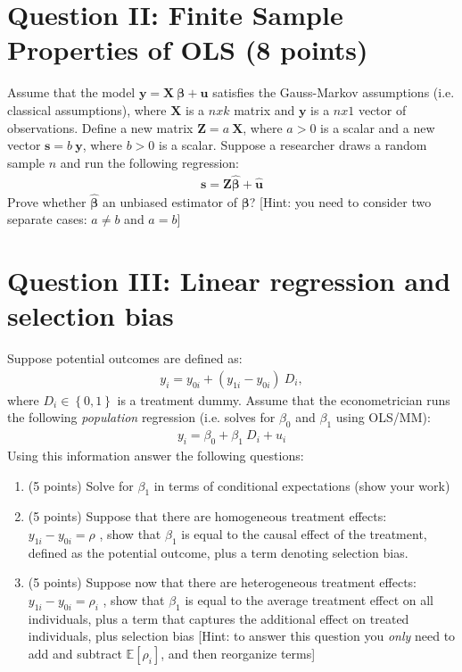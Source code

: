 \documentclass[letterpaper,12pt]{article}
\theoremstyle{dotlessS}
\begin{document}
\section*{Question II: Finite Sample Properties of OLS (8 points)}
Assume that the model $\bm{y}=\bm{X} \: \bm{\beta}+\bm{u}$ satisfies the Gauss-Markov assumptions (i.e. classical assumptions), where $\bm{X}$ is a $n x k$ matrix and $\bm{y}$ is a $n x 1$ vector of observations. Define a new matrix $\bm{Z}=a \: \bm{X}$, where $a>0$ is a scalar and a new vector $\bm{s}=b \: \bm{y}$, where $b>0$ is a scalar. Suppose a researcher draws a random sample $n$ and run the following regression:
\begin{eqnarray*}
\bm{s}=\bm{Z} \bm{\hat{\beta}}+\bm{\hat{u}}
\end{eqnarray*}
Prove whether $\bm{\hat{\beta}}$ an unbiased estimator of $\bm{\beta}$? [Hint: you need to consider two separate cases: $a \neq b$ and $a=b$] 



\section*{Question III: Linear regression and selection bias }
Suppose potential outcomes are defined as:
\begin{eqnarray*}
y_i=y_{0i}+(y_{1i}-y_{0i}) \: D_i,
\end{eqnarray*}
where $D_i \in \left\{0,1\right\}$ is a treatment dummy. Assume that the econometrician runs the following \textit{population} regression (i.e. solves for $\beta_0$ and $\beta_1$ using OLS/MM):
\begin{eqnarray*}
y_i=\beta_0+\beta_1 \: D_i+u_i
\end{eqnarray*}
Using this information answer the following questions:
\begin{enumerate}[label=(\alph*)]
\item (5 points) Solve for $\beta_1$ in terms of conditional expectations (show your work)
\item (5 points) Suppose that there are homogeneous treatment effects: $y_{1i}-y_{0i}=\rho$ , show that $\beta_1$ is equal to the causal effect of the treatment, defined as the potential outcome, plus a term denoting selection bias. 
\item (5 points) Suppose now that there are heterogeneous treatment effects: $y_{1i}-y_{0i}=\rho_i$ , show that $\beta_1$ is equal to the average treatment effect on all individuals, plus a term that captures the additional effect on treated individuals, plus selection bias [Hint: to answer this question you \textit{only} need to add and subtract $\mathbb{E}[\rho_i]$, and then reorganize terms]
 
\end{enumerate}
     
\end{document}
